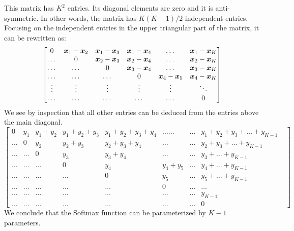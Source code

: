 {$$$$
This matrix has $K^2$ entries. Its diagonal elements are zero and it is anti-symmetric. In other words, the matrix has $K(K-1)/2$ independent entries. Focusing on the independent entries in the upper triangular part of the matrix, it can be rewritten as:
$$\begin{bmatrix}
    0&{\bm{x}}_1-{\bm{x}}_2&{\bm{x}}_1-{\bm{x}}_3&{\bm{x}}_1-{\bm{x}}_4&\dots &{\bm{x}}_1-{\bm{x}}_K\\
    \dots &0&{\bm{x}}_2-{\bm{x}}_3&{\bm{x}}_2-{\bm{x}}_4&\dots &{\bm{x}}_2-{\bm{x}}_K\\
    \dots &\dots &0&{\bm{x}}_3-{\bm{x}}_4&\dots &{\bm{x}}_3-{\bm{x}}_K\\
    \dots &\dots &\dots &0&{\bm{x}}_4-{\bm{x}}_5&{\bm{x}}_4-{\bm{x}}_K\\
    \vdots& \vdots & \vdots &\vdots &\vdots&\ddots \\
     \dots &\dots&\dots&\dots &\dots&0\\
\end{bmatrix}
$$
We see by inspection that all other entries can be deduced from the entries above the main diagonal.
$$\begin{bmatrix}
    0& y_1&y_1+y_2&y_1+y_2+y_3&y_1+y_2+y_3+y_4&\dots \dots&\dots&y_1+y_2+y_3+\dots+y_{K-1}\\
    \dots &0&y_2&y_2+y_3&y_2+y_3+y_4&\dots&\dots &y_2+y_3+\dots+y_{K-1}\\
    \dots &\dots &0&y_3&y_3+y_4&\dots&\dots&y_3+\dots+y_{K-1}\\
    \dots &\dots &\dots &0&y_4&y_4+y_5&\dots&y_4+\dots+y_{K-1}\\
    \dots& \dots & \dots &\dots &0&y_5&\dots&y_5+\dots+y_{K-1} \\
    \dots &\dots&\dots&\dots &\dots&0&\dots&\dots&\\
     \dots &\dots&\dots&\dots &\dots&\dots&\dots&y_{K-1}\\
     \dots &\dots&\dots&\dots &\dots&\dots&\dots&0
\end{bmatrix}
$$
We conclude that the Softmax function can be parameterized by $K-1$ parameters. 
}